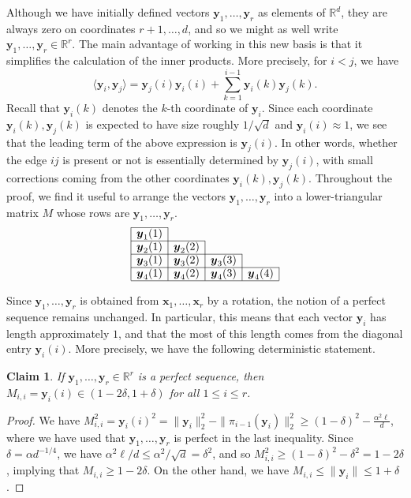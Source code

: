 \documentclass[11pt]{amsart}
\newtheorem{claim}[theorem]{\bf Claim}
\theoremstyle{definition}
\def\bR{\mathbb{R}}
\def\bx{\boldsymbol{x}}
\def\by{\boldsymbol{y}}
\begin{document}
Although we have initially defined vectors $\by_1, \dots, \by_r$ as elements of $\bR^d$, they are always zero on coordinates $r+1, \dots, d$, and so we might as well write $\by_1, \dots, \by_r\in \bR^r$. The main advantage of working in this new basis is that it simplifies the calculation of the inner products. More precisely, for $i<j$, we have
{\smaller[0.3]
\[\langle \by_i, \by_j\rangle=\by_j(i)\by_i(i) + \sum_{k=1}^{i-1}\by_i(k)\by_j(k).\]
}
Recall that $\by_i(k)$ denotes the $k$-th coordinate of $\by_i$. Since each coordinate $\by_i(k), \by_j(k)$ is expected to have size roughly $1/\sqrt{d}$ and $\by_i(i)\approx 1$, we see that the leading term of the above expression is $\by_j(i)$. In other words, whether the edge $ij$ is present or not is essentially determined by $\by_j(i)$, with small corrections coming from the other coordinates $\by_i(k), \by_j(k)$. Throughout the proof, we find it useful to arrange the vectors $\by_1, \dots, \by_r$ into a lower-triangular matrix $M$ whose rows are $\by_1, \dots, \by_r$.
{\smaller[0.3]
\[
\begin{array}{|c|c|c|c|}
\cline{1-1}
\by_1(1)   \\ \cline{1-2}
\by_2(1) & \by_2(2)   \\ \cline{1-3}
\by_3(1) & \by_3(2) & \by_3(3) \\ \cline{1-4}
\by_4(1) & \by_4(2) & \by_4(3) & \by_4(4) \\ \cline{1-4}
\end{array}
\]
}

Since $\by_1, \dots, \by_r$ is obtained from $\bx_1, \dots, \bx_r$ by a rotation, the notion of a perfect sequence remains unchanged. In particular, this means that each vector $\by_i$ has length approximately $1$, and that the most of this length comes from the diagonal entry $\by_i(i)$. More precisely, we have the following deterministic statement.

\begin{claim}\label{claim:diagonal_bound}
If $\by_1, \dots, \by_r\in \bR^r$ is a perfect sequence, then $M_{i, i}=\by_i(i)\in (1-2\delta, 1+\delta)$ for all $1\leq i\leq r$.
\end{claim}
\begin{proof}
We have $M_{i, i}^2=\by_i(i)^2=\|\by_i\|_2^2-\|\pi_{i-1}(\by_i)\|_2^2\geq (1-\delta)^2-\frac{\alpha^2\ell}{d}$, where we have used that $\by_1, \dots, \by_r$ is perfect in the last inequality. Since $\delta=\alpha d^{-1/4}$, we have $\alpha^2\ell/d\leq \alpha^2/\sqrt{d}=\delta^2$, and so $M_{i, i}^2\geq (1-\delta)^2-\delta^2=1-2\delta$, implying that $M_{i, i}\geq 1-2\delta$. On the other hand, we have $M_{i, i}\leq \|\by_i\|\leq 1+\delta$.
\end{proof}
\end{document}
